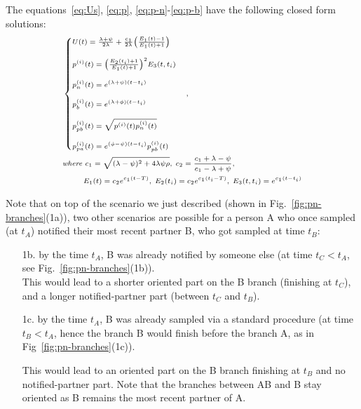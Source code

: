 \documentclass[a4paper,10pt]{article}
\begin{document}
The equations~\ref{eq:Us}, \ref{eq:p}, \ref{eq:p-n}-\ref{eq:p-b} have the following closed form solutions:
\begin{equation}
\scriptsize
\begin{split}
&\begin{cases}
U(t) = \frac{\lambda + \psi}{2\lambda} +  \frac{c_1}{2\lambda}\Big(\frac{E_1(t) - 1}{E_1(t) + 1}\Big)\\
\\
p^{(i)}(t) = \Big(\frac{E_2(t_i) + 1}{E_1(t) + 1}\Big)^2E_3(t, t_i) \\
\\
p_n^{(i)}(t) =  e^{(\lambda + \psi) (t -t_i)}\\
\\
p_b^{(i)}(t) =  e^{(\lambda + \phi) (t -t_i)}
\\
\\
p_{pb}^{(i)}(t) =  \sqrt{p^{(i)}(t)p_n^{(i)}(t)} \\
\\
p_{pa}^{(i)}(t) =  e^{(\phi-\psi) (t -t_i)} p_{pb}^{(i)}(t) 
\end{cases},\\
& \textit{where } c_1 = \sqrt{(\lambda - \psi)^2 + 4 \lambda\psi\rho},\; c_2 = \frac{c_1 + \lambda - \psi}{c_1 - \lambda + \psi},\\
& ~~~~~~~~E_1(t) = c_2 e^{c_1 (t -T)},\; E_2(t_i) = c_2 e^{c_1 (t_i -T)},\; E_3(t, t_i) = e^{c_1 (t -t_i)}\\
\end{split}\label{eq:ps}
\end{equation}

Note that on top of the scenario we just described (shown in Fig.~\ref{fig:pn-branches}(1a)), two other scenarios are possible for a person A who once sampled (at $t_A$) notified their most recent partner B, who got sampled at time $t_B$:
\begin{enumerate}

\item[1b.] by the time $t_A$, B was already notified by someone else (at time $t_C < t_A$, see Fig.~\ref{fig:pn-branches}(1b)).
\\

This would lead to a shorter oriented part on the B branch (finishing at $t_C$), and a longer notified-partner part (between $t_C$ and $t_B$). 
 

\item[1c.] by the time $t_A$, B was already sampled via a standard procedure (at time $t_B < t_A$, hence the branch B would finish before the branch A, as in Fig~\ref{fig:pn-branches}(1c)).

This would lead to an oriented part on the B branch finishing at $t_B$ and no notified-partner part. Note that the branches between AB and B stay oriented as B remains the most recent partner of A.
\end{enumerate}
\end{document}

